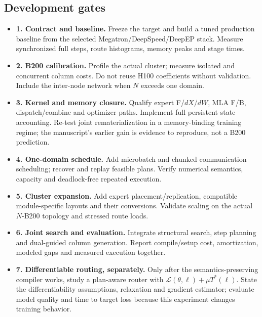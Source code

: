 \documentclass[10pt]{article}
\newenvironment{tight}
  {\begin{itemize}[leftmargin=13pt,itemsep=4pt,topsep=4pt,parsep=0pt,
     label=\textcolor{ink3}{\footnotesize$\bullet$}]\color{ink2}}
  {\end{itemize}}
\begin{document}
\subsection{Development gates}
\begin{tight}
\item \textbf{\color{ink}1. Contract and baseline.} Freeze the target and build
a tuned production baseline from the selected Megatron/DeepSpeed/DeepEP stack.
Measure synchronized full steps, route histograms, memory peaks and stage times.
\item \textbf{\color{ink}2. B200 calibration.} Profile the actual cluster;
measure isolated and concurrent column costs. Do not reuse H100 coefficients
without validation. Include the inter-node network when $N$ exceeds one domain.
\item \textbf{\color{ink}3. Kernel and memory closure.} Qualify expert F/$dX$/$dW$,
MLA F/B, dispatch/combine and optimizer paths. Implement full persistent-state
accounting. Re-test joint rematerialization in a memory-binding training regime;
the manuscript's earlier gain is evidence to reproduce, not a B200 prediction.
\item \textbf{\color{ink}4. One-domain schedule.} Add microbatch and chunked
communication scheduling; recover and replay feasible plans. Verify numerical
semantics, capacity and deadlock-free repeated execution.
\item \textbf{\color{ink}5. Cluster expansion.} Add expert placement/replication,
compatible module-specific layouts and their conversions. Validate scaling on
the actual $N$-B200 topology and stressed route loads.
\item \textbf{\color{ink}6. Joint search and evaluation.} Integrate structural
search, step planning and dual-guided column generation. Report compile/setup
cost, amortization, modeled gaps and measured execution together.
\item \textbf{\color{ink}7. Differentiable routing, separately.} Only after the
semantics-preserving compiler works, study a plan-aware router with
$\mathcal L(\theta,\ell)+\mu T^*(\ell)$. State the differentiability assumptions,
relaxation and gradient estimator; evaluate model quality and time to target
loss because this experiment changes training behavior.
\end{tight}
\end{document}
